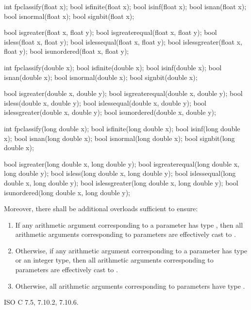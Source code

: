 %
%
%
%
%
%
%
%
%
%
%
%
\begin{codeblock}
int fpclassify(float x);
bool isfinite(float x);
bool isinf(float x);
bool isnan(float x);
bool isnormal(float x);
bool signbit(float x);

bool isgreater(float x, float y);
bool isgreaterequal(float x, float y);
bool isless(float x, float y);
bool islessequal(float x, float y);
bool islessgreater(float x, float y);
bool isunordered(float x, float y);

int fpclassify(double x);
bool isfinite(double x);
bool isinf(double x);
bool isnan(double x);
bool isnormal(double x);
bool signbit(double x);

bool isgreater(double x, double y);
bool isgreaterequal(double x, double y);
bool isless(double x, double y);
bool islessequal(double x, double y);
bool islessgreater(double x, double y);
bool isunordered(double x, double y);

int fpclassify(long double x);
bool isfinite(long double x);
bool isinf(long double x);
bool isnan(long double x);
bool isnormal(long double x);
bool signbit(long double x);

bool isgreater(long double x, long double y);
bool isgreaterequal(long double x, long double y);
bool isless(long double x, long double y);
bool islessequal(long double x, long double y);
bool islessgreater(long double x, long double y);
bool isunordered(long double x, long double y);
\end{codeblock}

\pnum
Moreover, there shall be additional overloads sufficient to ensure:
\begin{enumerate}
  \item If any arithmetic argument corresponding to a 
    parameter has type , then all arithmetic
    arguments corresponding to  parameters are
    effectively cast to .
  \item Otherwise, if any arithmetic argument corresponding to a
     parameter has type  or an integer
    type, then all arithmetic arguments corresponding to
     parameters are effectively cast to .
  \item Otherwise, all arithmetic arguments corresponding to 
     parameters have type .
\end{enumerate}

\xref
ISO C 7.5, 7.10.2, 7.10.6.
